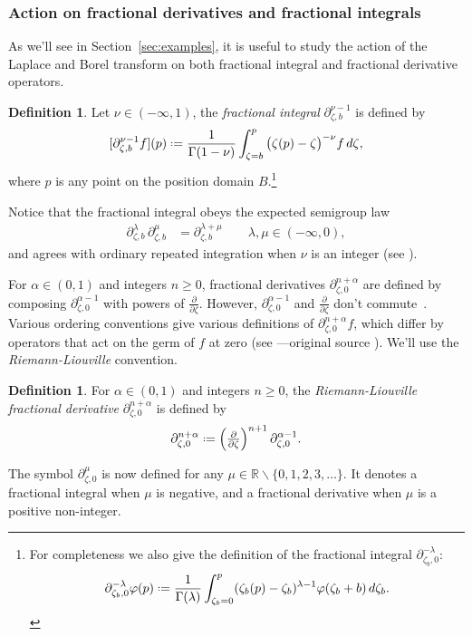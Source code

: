 \documentclass{article}
\newcommand{\R}{\mathbb{R}}
\newcommand{\fracderiv}[3]{\partial^{#1}_{#2, #3}}
\newcommand*{\defeq}{\mathrel{\vcenter{\baselineskip0.5ex \lineskiplimit0pt
                     \hbox{\scriptsize.}\hbox{\scriptsize.}}}%
                     =}
\theoremstyle{definition}
\newtheorem{defn}{Definition}
\newtheorem{definition}{Definition}[section]
\theoremstyle{plain}
\begin{document}
\subsubsection{Action on fractional derivatives and fractional integrals}\label{sec:frac-diff-laplace}
As we'll see in Section~\ref{sec:examples}, it is useful to study the action of the Laplace and Borel transform on both fractional integral and fractional derivative operators.
\begin{defn}
    Let $\nu \in (-\infty, 1)$, the \textit{fractional integral} $\partial^{\nu-1}_{\zeta, b}$ is defined by
\[ [\partial^{\nu-1}_{\zeta, b} f](p) \defeq \frac{1}{\Gamma(1-\nu)} \int_{\zeta =b}^p \big(\zeta(p)-\zeta\big)^{-\nu} f\,d\zeta, \]
where $p$ is any point on the position domain $B$.\footnote{For completeness we also give the definition of the fractional integral $\partial_{\zeta_b,0}^{-\lambda}$: 
%
\begin{equation*}
    \partial_{\zeta_b,0}^{-\lambda}\varphi(p)\defeq\frac{1}{\Gamma(\lambda)}\int_{\zeta_b=0}^{p}(\zeta_b(p)-\zeta_b)^{\lambda-1} \varphi(\zeta_b+b)\, d\zeta_b.
\end{equation*}} 
\end{defn}
Notice that the fractional integral obeys the expected semigroup law \cite[Section  1.3]{mladenov2014advanced}
\begin{align*}
\fracderiv{\lambda}{\zeta}{b}\,\fracderiv{\mu}{\zeta}{b} & = \fracderiv{\lambda+\mu}{\zeta}{b} \qquad \lambda, \mu \in (-\infty, 0),
\end{align*}
and agrees with ordinary repeated integration when $\nu$ is an integer (see \cite[Equation 35]{mladenov2014advanced}).

For $\alpha \in (0, 1)$ and integers $n \ge 0$, fractional derivatives $\fracderiv{n+\alpha}{\zeta}{0}$ are defined by composing $\fracderiv{\alpha-1}{\zeta}{0}$ with powers of $\tfrac{\partial}{\partial \zeta}$. However, $\fracderiv{\alpha-1}{\zeta}{0}$ and $\tfrac{\partial}{\partial \zeta}$ don't commute~\cite[equation 54]{mladenov2014advanced}. Various ordering conventions give various definitions of $\fracderiv{n+\alpha}{\zeta}{0} f$, which differ by operators that act on the germ of $f$ at zero (see \cite[Section 1.3]{mladenov2014advanced}---original source \cite{podlubny}). We'll use the {\em Riemann-Liouville} convention.
\begin{definition}\label{defn:frac_driv}
For $\alpha \in (0, 1)$ and integers $n \ge 0$, the {\em Riemann-Liouville fractional derivative} $\fracderiv{n+\alpha}{\zeta}{0}$ is defined by
\[ \fracderiv{n+\alpha}{\zeta}{0} \defeq \left(\tfrac{\partial}{\partial \zeta}\right)^{n+1} \fracderiv{\alpha-1}{\zeta}{0}. \]
\end{definition}
The symbol $\fracderiv{\mu}{\zeta}{0}$ is now defined for any $\mu \in \R \smallsetminus \{0, 1, 2, 3, \ldots\}$. It denotes a fractional integral when $\mu$ is negative, and a fractional derivative when $\mu$ is a positive non-integer.
\end{document}
